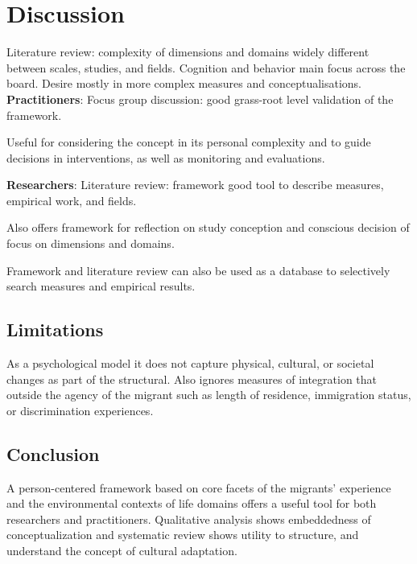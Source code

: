 \documentclass[man, 12pt, a4paper]{apa7}
\begin{document}
\section{Discussion}

Literature review: complexity of dimensions and domains widely different between scales, studies, and fields. Cognition and behavior main focus across the board. Desire mostly in more complex measures and conceptualisations.
\textbf{Practitioners}: Focus group discussion: good grass-root level validation of the framework.

Useful for considering the concept in its personal complexity and to guide decisions in interventions, as well as monitoring and evaluations. 

\textbf{Researchers}: Literature review: framework good tool to describe measures, empirical work, and fields.

Also offers framework for reflection on study conception and conscious decision of focus on dimensions and domains.

Framework and literature review can also be used as a database to selectively search measures and empirical results.
\subsection{Limitations}
As a psychological model it does not capture physical, cultural, or societal changes as part of the structural. Also ignores measures of integration that outside the agency of the migrant such as length of residence, immigration status, or discrimination experiences.

\subsection{Conclusion}
A person-centered framework based on core facets of the migrants’ experience and the environmental contexts of life domains offers a useful tool for both researchers and practitioners. Qualitative analysis shows embeddedness of conceptualization and systematic review shows utility to structure, and understand the concept of cultural adaptation.
\end{document}
